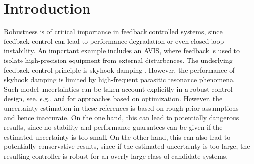 
\section{Introduction}
\label{sec:Intro}

Robustness is of critical importance in feedback controlled systems, since feedback control can lead to performance degradation or even closed-loop instability. 
An important example includes an \gls{AVIS}, where feedback is used to isolate high-precision equipment from external disturbances. 
The underlying feedback control principle is skyhook damping \citep{Karnopp1995}. However, the performance of skyhook damping is limited by high-frequent parasitic resonance phenomena. 
Such model uncertainties can be taken account explicitly in a robust control design, see, e.g., \citet{Zhang2005HybridAvis} and \citet{Chida2008} for approaches based on \Hinf{} optimization. 
However, the uncertainty estimation in these references is based on rough prior assumptions and hence inaccurate. 
On the one hand, this can lead to potentially dangerous results, since no stability and performance guarantees can be given if the estimated uncertainty is too small. 
On the other hand, this can also lead to potentially conservative results, since if the estimated uncertainty is too large, the resulting controller is robust for an overly large class of candidate systems.

